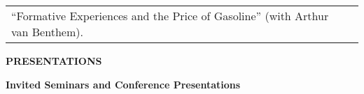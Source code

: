 \documentclass[english, 10pt]{report}
\begin{document}
%

\vspace{-0.1in}

{\bf \underline{}}

\begin{longtable}{@{}p{6.5in}p{0in}}
	``Formative Experiences and the Price of Gasoline'' (with Arthur van Benthem).
\end{longtable}


%

{\bf {PRESENTATIONS}}

{\bf Invited Seminars and Conference Presentations}

\end{document}
